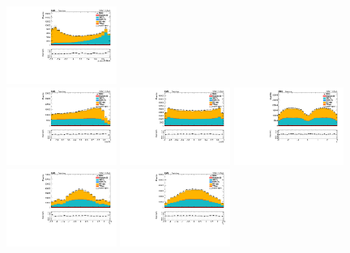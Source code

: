 \begin{figure}[tb]
\begin{center}
		\includegraphics[width=0.32\textwidth]{fig/MVA/sc_all_kin_phomva_valid_ptwei_EE_cat0.pdf}\\
		\includegraphics[width=0.32\textwidth]{fig/MVA/sc_all_kin_coscaptheta_valid_ptwei_cat0.pdf}
		\includegraphics[width=0.32\textwidth]{fig/MVA/sc_all_kin_costheta_valid_ptwei_cat0.pdf}
		\includegraphics[width=0.32\textwidth]{fig/MVA/sc_all_kin_phi_valid_ptwei_cat0.pdf}\\
		\includegraphics[width=0.32\textwidth]{fig/MVA/sc_all_kin_phoeta_valid_ptwei_cat0.pdf}
		\includegraphics[width=0.32\textwidth]{fig/MVA/sc_all_kin_lepeta1_valid_ptwei_cat0.pdf}

\end{center}
\end{figure}
